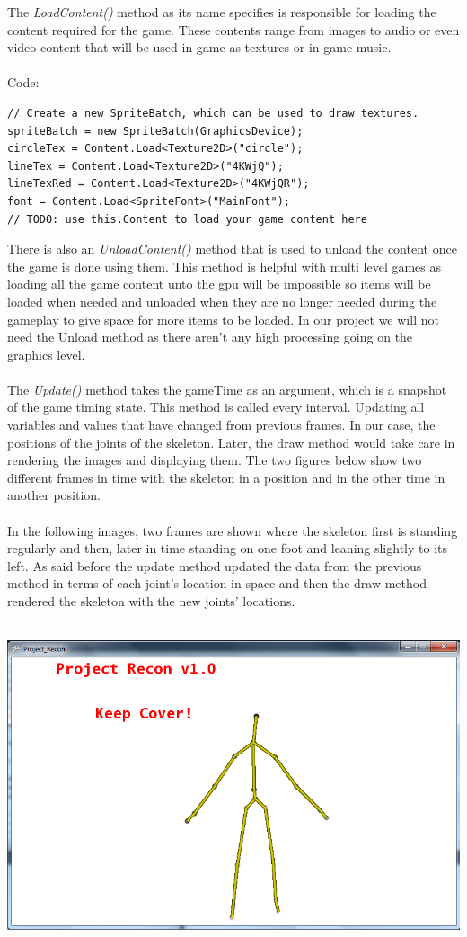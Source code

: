 \documentclass[11pt]{article} %
\begin{document}
The \emph{LoadContent()} method as its name specifies is responsible for loading the content required for the game. These contents range from images to audio or even video content that will be used in game as textures or in game music.
\\
\\
Code:
\begin{verbatim}
// Create a new SpriteBatch, which can be used to draw textures.
spriteBatch = new SpriteBatch(GraphicsDevice);
circleTex = Content.Load<Texture2D>("circle");
lineTex = Content.Load<Texture2D>("4KWjQ");
lineTexRed = Content.Load<Texture2D>("4KWjQR");
font = Content.Load<SpriteFont>("MainFont");
// TODO: use this.Content to load your game content here
\end{verbatim}
There is also an \emph{UnloadContent()} method that is used to unload the content once the game is done using them. This method is helpful with multi level games as loading all the game content unto the gpu will be impossible so items will be loaded when needed and unloaded when they are no longer needed during the gameplay to give space for more items to be loaded. In our project we will not need the Unload method as there aren't any high processing going on the graphics level.
\\
\\
The \emph{Update()} method takes the gameTime as an argument, which is a snapshot of the game timing state. This method is called every interval. Updating all variables and values that have changed from previous frames. In our case, the positions of the joints of the skeleton. Later, the draw method would take care in rendering the images and displaying them. The two figures below show two different frames in time with the skeleton in a position and in the other time in another position.
\\
\\
In the following images, two frames are shown where the skeleton first is standing regularly and then, later in time standing on one foot and leaning slightly to its left. As said before the update method updated the data from the previous method in terms of each joint's location in space and then the draw method rendered the skeleton with the new joints' locations.
\\
\\
\centerline{\includegraphics[scale=0.5]{skeleton_frame1.png}}
\end{document}
